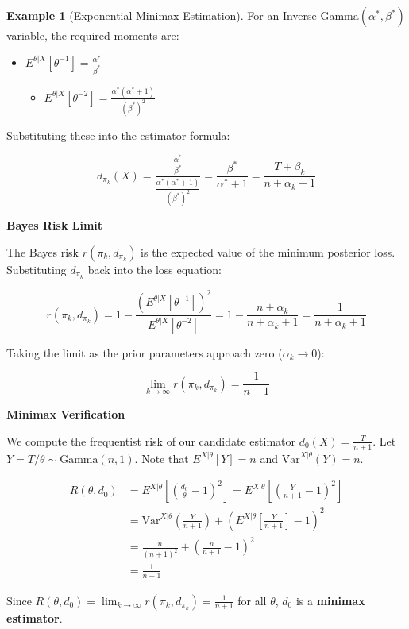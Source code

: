 \documentclass[
  letterpaper,
  DIV=11,
  numbers=noendperiod]{scrreprt}
\providecommand{\tightlist}{%
  \setlength{\itemsep}{0pt}\setlength{\parskip}{0pt}}
\renewcommand{\[}{\begin{equation}}
\renewcommand{\]}{\end{equation}}
\theoremstyle{definition}
\theoremstyle{plain}
\theoremstyle{plain}
\theoremstyle{plain}
\theoremstyle{definition}
\newtheorem{example}{Example}[chapter]
\theoremstyle{plain}
\theoremstyle{remark}
\begin{document}
\begin{example}[Exponential Minimax
Estimation]
For an Inverse-Gamma\((\alpha^*, \beta^*)\) variable, the required
moments are:

\begin{itemize}
\tightlist
\item
  \(E^{\theta|X}[\theta^{-1}] = \frac{\alpha^*}{\beta^*}\)

  \begin{itemize}
  \tightlist
  \item
    \(E^{\theta|X}[\theta^{-2}] = \frac{\alpha^* (\alpha^* + 1)}{(\beta^*)^2}\)
  \end{itemize}
\end{itemize}

Substituting these into the estimator formula:

\[
d_{\pi_k}(X) = \frac{ \frac{\alpha^*}{\beta^*} }{ \frac{\alpha^* (\alpha^* + 1)}{(\beta^*)^2} } = \frac{\beta^*}{\alpha^* + 1} = \frac{T + \beta_k}{n + \alpha_k + 1}
\]

\textbf{Bayes Risk Limit}

The Bayes risk \(r(\pi_k, d_{\pi_k})\) is the expected value of the
minimum posterior loss. Substituting \(d_{\pi_k}\) back into the loss
equation:

\[
r(\pi_k, d_{\pi_k}) = 1 - \frac{(E^{\theta|X}[\theta^{-1}])^2}{E^{\theta|X}[\theta^{-2}]} = 1 - \frac{n + \alpha_k}{n + \alpha_k + 1} = \frac{1}{n + \alpha_k + 1}
\]

Taking the limit as the prior parameters approach zero
(\(\alpha_k \to 0\)):

\[
\lim_{k \to \infty} r(\pi_k, d_{\pi_k}) = \frac{1}{n+1}
\]

\textbf{Minimax Verification}

We compute the frequentist risk of our candidate estimator
\(d_0(X) = \frac{T}{n+1}\). Let
\(Y = T/\theta \sim \text{Gamma}(n, 1)\). Note that
\(E^{X|\theta}[Y]=n\) and \(\text{Var}^{X|\theta}(Y)=n\).

\[
\begin{aligned}
R(\theta, d_0) &= E^{X|\theta} \left[ \left( \frac{d_0}{\theta} - 1 \right)^2 \right] = E^{X|\theta} \left[ \left( \frac{Y}{n+1} - 1 \right)^2 \right] \\
&= \text{Var}^{X|\theta}\left(\frac{Y}{n+1}\right) + \left(E^{X|\theta}\left[\frac{Y}{n+1}\right]-1\right)^2 \\
&= \frac{n}{(n+1)^2} + \left( \frac{n}{n+1} - 1 \right)^2 \\
&= \frac{1}{n+1}
\end{aligned}
\]

Since
\(R(\theta, d_0) = \lim_{k \to \infty} r(\pi_k, d_{\pi_k}) = \frac{1}{n+1}\)
for all \(\theta\), \(d_0\) is a \textbf{minimax estimator}.

\end{example}
\end{document}
